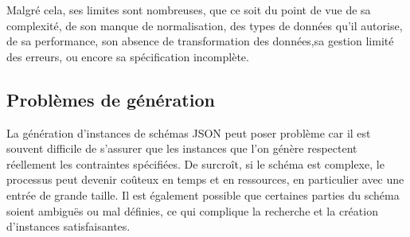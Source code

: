 \documentclass{article}
\begin{document}
Malgré cela, ses limites sont nombreuses, que ce soit du point de vue de sa complexité, de son manque de normalisation, des types de données qu'il autorise, de sa performance, son absence de transformation des données,sa gestion limité des erreurs, ou encore sa spécification incomplète.

    \subsection{Problèmes de génération}
    La génération d'instances de schémas JSON peut poser problème car il est souvent difficile de s'assurer que les instances que l'on génère respectent réellement les contraintes spécifiées. De surcroît, si le schéma est complexe, le processus peut devenir coûteux en temps et en ressources, en particulier avec une entrée de grande taille. Il est également possible que certaines parties du schéma soient ambiguës ou mal définies, ce qui complique la recherche et la création d'instances satisfaisantes.
\end{document}
